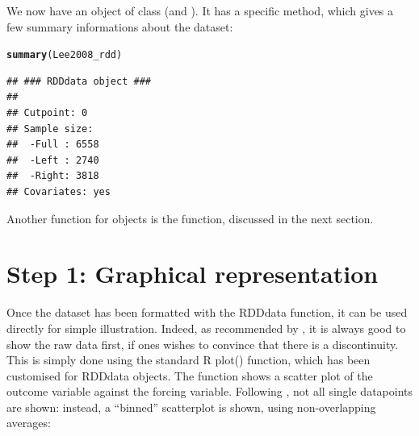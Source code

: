 \documentclass[english,nojss]{jss}\usepackage{graphicx, color}
\makeatletter
\newcommand{\hlfunctioncall}[1]{\textcolor[rgb]{0.501960784313725,0,0.329411764705882}{\textbf{#1}}}%
\newenvironment{kframe}{%
 \def\at@end@of@kframe{}%
 \ifinner\ifhmode%
  \def\at@end@of@kframe{\end{minipage}}%
  \begin{minipage}{\columnwidth}%
 \fi\fi%
 \def\FrameCommand##1{\hskip\@totalleftmargin \hskip-\fboxsep
 \colorbox{shadecolor}{##1}\hskip-\fboxsep
     \hskip-\linewidth \hskip-\@totalleftmargin \hskip\columnwidth}%
 \MakeFramed {\advance\hsize-\width
   \@totalleftmargin\z@ \linewidth\hsize
   \@setminipage}}%
 {\par\unskip\endMakeFramed%
 \at@end@of@kframe}
\newenvironment{knitrout}{}{} %
\makeatother
\begin{document}
We now have an object  of class 
(and ). It has a specific  method,
which gives a few summary informations about the dataset:

\begin{knitrout}
\color{fgcolor}\begin{kframe}
\begin{alltt}
\hlfunctioncall{summary}(Lee2008_rdd)
\end{alltt}
\begin{verbatim}
## ### RDDdata object ###
## 
## Cutpoint: 0 
## Sample size: 
## 	-Full : 6558 
## 	-Left : 2740 
## 	-Right: 3818
## Covariates: yes
\end{verbatim}
\end{kframe}
\end{knitrout}


Another function for  objects is the 
function, discussed in the next section. 


\section{Step 1: Graphical representation}


Once the dataset has been formatted with the RDDdata function, it
can be used directly for simple illustration. Indeed, as recommended
by \citet{LeeLemieux2010}, it is always good to show the raw data
first, if ones wishes to convince that there is a discontinuity. This
is simply done using the standard R plot() function, which has been
customised for RDDdata objects. The function shows a scatter plot
of the outcome variable against the forcing variable. Following \citet{LeeLemieux2010},
not all single datapoints are shown: instead, a ``binned'' scatterplot
is shown, using non-overlapping averages:
\end{document}
